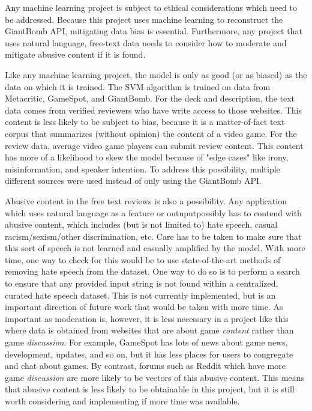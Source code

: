 \documentclass[10pt,twocolumn]{article}
\begin{document}
Any machine learning project is subject to ethical considerations which need to be addressed. Because this project uses machine learning to reconstruct the GiantBomb API, mitigating data bias is essential. Furthermore, any project that uses natural language, free-text data needs to consider how to moderate and mitigate abusive content if it is found.

Like any machine learning project, the model is only as good (or as biased) as the data on which it is trained. The SVM algorithm is trained on data from Metacritic, GameSpot, and GiantBomb. For the deck and description, the text data comes from verified reviewers who have write access to those websites. This content is less likely to be subject to bias, because it is a matter-of-fact text corpus that summarizes (without opinion) the content of a video game. For the review data, average video game players can submit review content. This content has more of a likelihood to skew the model because of "edge cases" like irony, misinformation, and speaker intention. \cite{Vidgen} To address this possibility, multiple different sources were used instead of only using the GiantBomb API.

Abusive content in the free text reviews is also a possibility. Any application which uses natural language as a feature or outuputpossibly has to contend with abusive content, which includes (but is not limited to) hate speech, casual racism/sexism/other discrimination, etc. Care has to be taken to make sure that this sort of speech is not learned and casually amplified by the model. With more time, one way to check for this would be to use state-of-the-art methods of removing hate speech from the dataset. One way to do so is to perform a search to ensure that any provided input string is not found within a centralized, curated hate speech dataset. \cite{Mathew} This is not currently implemented, but is an important direction of future work that would be taken with more time. As important as moderation is, however, it is less necessary in a project like this where data is obtained from websites that are about game \textit{content} rather than game \textit{discussion}. For example, GameSpot has lots of news about game news, development, updates, and so on, but it has less places for users to congregate and chat about games. By contrast, forums such as Reddit which have more game \textit{discussion} are more likely to be vectors of this abusive content. This means that abusive content is less likely to be obtainable in this project, but it is still worth considering and implementing if more time was available.
\end{document}
